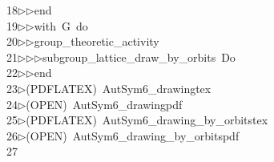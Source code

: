 \begin{tabbing}
18\>$\triangleright$\>$\triangleright$\>end\ \\[0pt]
19\>$\triangleright$\>$\triangleright$\>with\ G\ do\ \\[0pt]
20\>$\triangleright$\>$\triangleright$\>group\_theoretic\_activity\ \\[0pt]
21\>$\triangleright$\>$\triangleright$\>$\triangleright$\>subgroup\_lattice\_draw\_by\_orbits\ Do\ \\[0pt]
22\>$\triangleright$\>$\triangleright$\>end\\[0pt]
23\>$\triangleright$\>(PDFLATEX)\ AutSym6\_drawingtex\\[0pt]
24\>$\triangleright$\>(OPEN)\ AutSym6\_drawingpdf\\[0pt]
25\>$\triangleright$\>(PDFLATEX)\ AutSym6\_drawing\_by\_orbitstex\\[0pt]
26\>$\triangleright$\>(OPEN)\ AutSym6\_drawing\_by\_orbitspdf\\[0pt]
27\>\end{tabbing}
